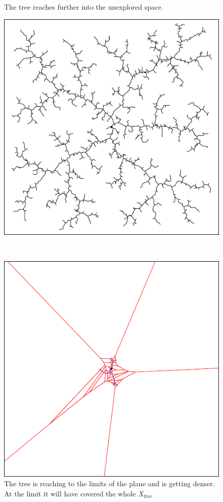 \documentclass[conference]{IEEEtran}
\begin{document}
\begin{figure}[h]
\begin{minipage}[t]{0.3\linewidth}
\caption{The tree reaches further into the unexplored space.}
\end{minipage}
\hfill
\begin{minipage}[t]{0.3\linewidth}
\centering
\includegraphics[width=1\textwidth]{images/RRT/03.png}
\caption{The tree is reaching to the limits of the plane and is getting denser. At the limit it will have covered the whole $X_\text{free}$}
\end{minipage}
\\
\begin{minipage}[t]{0.3\linewidth}
\centering
\includegraphics[width=1\textwidth]{images/RRT/01_v.png}

\end{minipage}
\end{figure}
\end{document}
